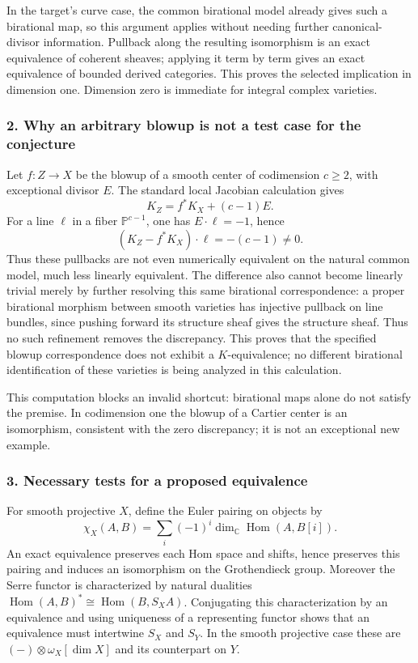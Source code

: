 \documentclass[11pt]{article}
\begin{document}
In the target's curve case, the common birational model already gives such a birational map, so this argument applies without needing further canonical-divisor information. Pullback along the resulting isomorphism is an exact equivalence of coherent sheaves; applying it term by term gives an exact equivalence of bounded derived categories. This proves the selected implication in dimension one. Dimension zero is immediate for integral complex varieties.

\subsubsection{2. Why an arbitrary blowup is not a test case for the conjecture}
Let $f:Z\to X$ be the blowup of a smooth center of codimension $c\ge2$, with exceptional divisor $E$. The standard local Jacobian calculation gives
\[K_Z=f^*K_X+(c-1)E.\]
For a line $\ell$ in a fiber $\mathbb P^{c-1}$, one has $E\cdot\ell=-1$, hence
\[(K_Z-f^*K_X)\cdot\ell=-(c-1)\ne0.\]
Thus these pullbacks are not even numerically equivalent on the natural common model, much less linearly equivalent. The difference also cannot become linearly trivial merely by further resolving this same birational correspondence: a proper birational morphism between smooth varieties has injective pullback on line bundles, since pushing forward its structure sheaf gives the structure sheaf. Thus no such refinement removes the discrepancy. This proves that the specified blowup correspondence does not exhibit a $K$-equivalence; no different birational identification of these varieties is being analyzed in this calculation.

This computation blocks an invalid shortcut: birational maps alone do not satisfy the premise. In codimension one the blowup of a Cartier center is an isomorphism, consistent with the zero discrepancy; it is not an exceptional new example.

\subsubsection{3. Necessary tests for a proposed equivalence}
For smooth projective $X$, define the Euler pairing on objects by
\[\chi_X(A,B)=\sum_i(-1)^i\dim_{\mathbb C}\operatorname{Hom}(A,B[i]).\]
An exact equivalence preserves each Hom space and shifts, hence preserves this pairing and induces an isomorphism on the Grothendieck group. Moreover the Serre functor is characterized by natural dualities $\operatorname{Hom}(A,B)^*\cong\operatorname{Hom}(B,S_XA)$. Conjugating this characterization by an equivalence and using uniqueness of a representing functor shows that an equivalence must intertwine $S_X$ and $S_Y$. In the smooth projective case these are $(-)\otimes\omega_X[\dim X]$ and its counterpart on $Y$.
\end{document}
